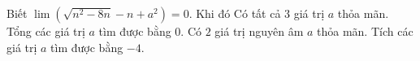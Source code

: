 \begin{ex}
Biết $\lim\left(\sqrt{n^2-8n}-n+a^2\right)=0$. Khi đó
\choiceTF
{Có tất cả $3$ giá trị $a$ thỏa mãn.}
{\True Tổng các giá trị $a$ tìm được bằng $0$.}
{Có $2$ giá trị nguyên âm $a$ thỏa mãn.}
{\True Tích các giá trị $a$ tìm được bằng $-4$.}
\end{ex}
